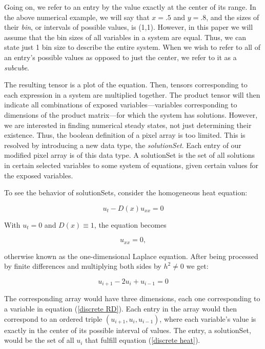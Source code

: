 \documentclass{article}
\begin{document}
Going on, we refer to an entry by the value exactly at the center of its range. In the above numerical example, we will say that $x = .5$ and $y = .8$, and the sizes of their \textit{bin}, or intervals of possible values, is (1,1). However, in this paper we will assume that the bin sizes of all variables in a system are equal. Thus, we can state just 1 bin size to describe the entire system. When we wish to refer to all of an entry's possible values as opposed to just the center, we refer to it as a \textit{subcube}.

The resulting tensor is a plot of the equation. Then, tensors corresponding to each expression in a system are multiplied together. The product tensor will then indicate all combinations of exposed variables---variables corresponding to dimensions of the product matrix---for which the system has solutions. However, we are interested in finding numerical steady states, not just determining their existence. Thus, the boolean definition of a pixel array is too limited. This is resolved by introducing a new data type, the \textit{solutionSet}. Each entry of our modified pixel array is of this data type. A solutionSet is the set of all solutions in certain selected variables to some system of equations, given certain values for the exposed variables.

To see the behavior of solutionSets, consider the homogeneous heat equation:

\begin{equation}
    \label{general homogeneous heat}
    u_t - D(x)u_{xx} = 0
\end{equation}

\noindent With $u_t = 0$ and $D(x) \equiv 1$, the equation becomes

\begin{equation}
    \label{homogeneous heat}
    u_{xx} = 0,
\end{equation}

\noindent otherwise known as the one-dimensional Laplace equation. After being processed by finite differences and multiplying both sides by $h^2 \ne 0$ we get: 

\begin{equation}
    \label{discrete heat}
    u_{i+1} - 2u_i + u_{i-1} = 0
\end{equation}

\noindent The corresponding array would have three dimensions, each one corresponding to a variable in equation (\ref{discrete RD}). Each entry in the array would then correspond to an ordered triple $(u_{i+1}, u_i, u_{i-1})$, where each variable's value is exactly in the center of its possible interval of values. The entry, a solutionSet, would be the set of all $u_i$ that fulfill equation (\ref{discrete heat}).
\end{document}
